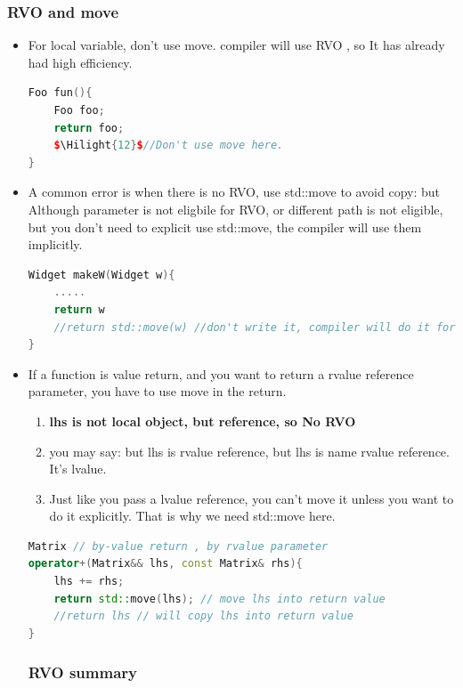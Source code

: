 \documentclass[a4paper,11pt,twoside]{book}
\newcommand{\Hilight}[1]{\makebox[0pt][l]{\color{yellow}\rule[-3pt]{#1em}{11pt}}}
\newcommand{\Hilight}[1]{}
\begin{document}
\subsubsection{RVO and move}
\begin{itemize}
	\item For local variable, don't use move. compiler will use RVO , so It has already had high efficiency.
	
\begin{lstlisting}[frame=single, language=c++]
Foo fun(){
	Foo foo;
	return foo;
	$\Hilight{12}$//Don't use move here.
}
	\end{lstlisting}
	
	\item A common error is when there is no RVO, use std::move to avoid copy: but Although parameter is not eligbile for RVO, or different path is not eligible, but you don't need to explicit use std::move, the compiler will use them implicitly.
	
\begin{lstlisting}[frame=single, language=c++]
Widget makeW(Widget w){
	.....
	return w
	//return std::move(w) //don't write it, compiler will do it for you.
} 
	\end{lstlisting}
	
	\item If a function is value return, and you want to return a rvalue reference parameter, you have to use move in the return.
	\begin{enumerate}
		\item \textbf{lhs is not local object, but reference, so No RVO}
		\item you may say: but lhs is rvalue reference, but lhs is name rvalue reference. It's lvalue.
		\item Just like you pass a lvalue reference, you can't move it unless you want to do it explicitly. That is why we need std::move here.
	\end{enumerate}
\begin{lstlisting}[frame=single, language=c++]
Matrix // by-value return , by rvalue parameter
operator+(Matrix&& lhs, const Matrix& rhs){
	lhs += rhs;
	return std::move(lhs); // move lhs into return value
	//return lhs // will copy lhs into return value 
} 
	\end{lstlisting}

\subsubsection{RVO summary}


\end{itemize}
\end{document}
